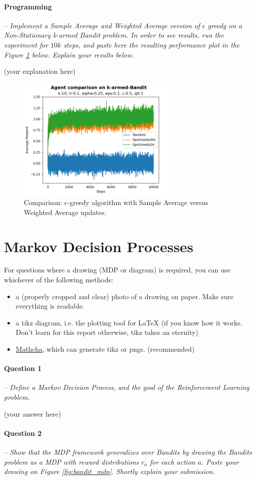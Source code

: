 \documentclass[a4paper]{article}
\newcommand{\question}[2]{
\paragraph{Question #1} -- \textit{#2}

}
\newcommand{\programming}[1]{
\paragraph{Programming} -- \textit{#1}

}
\begin{document}
		\programming{Implement a Sample Average and Weighted Average version of $\epsilon$ greedy on a Non-Stationary k-armed Bandit problem. 
				In order to see results, run the experiment for $10k$ steps, and paste here the resulting performance plot in the Figure \ref{fig:sa_vs_wa} below. 
				Explain your results below.}
			(your explanation here)
			\begin{figure}[H]
				\centering
				\includegraphics[width=8cm]{plots/agent_comparison_perf}
				\caption{Comparison: $\epsilon$-greedy algorithm with Sample Average versus Weighted Average updates.}
				\label{fig:sa_vs_wa}
			\end{figure}{}


	\section{Markov Decision Processes}
		For questions where a drawing (MDP or diagram) is required, you can use whichever of the following methods:
		\begin{itemize}
			\item a (properly cropped and clear) photo of a drawing on paper. 
				Make sure everything is readable.
			\item a tikz diagram, i.e. the plotting tool for LaTeX (if you know how it works. Don't learn for this report otherwise, tikz takes an eternity)
			\item \href{www.mathcha.io}{Mathcha}, which can generate tikz or pngs. (recommended)
		\end{itemize}{}

		\question{1}{Define a Markov Decision Process, and the goal of the Reinforcement Learning problem.}
			(your answer here)

		\question{2}{Show that the MDP framework generalizes over Bandits by drawing the Bandits problem as a MDP with reward distributions $r_a$ for each action $a$. 
				Paste your drawing on Figure \ref{fig:bandit_mdp}. 
				Shortly explain your submission.}
\end{document}
